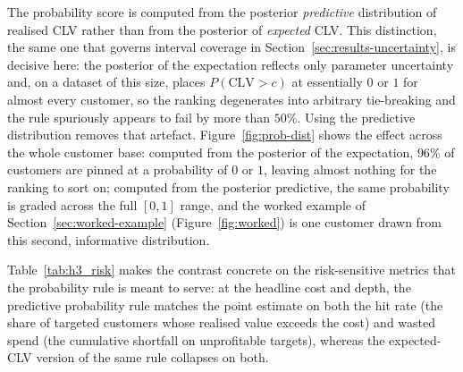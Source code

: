 

The probability score is computed from the posterior \emph{predictive} distribution of realised CLV rather than from the posterior of \emph{expected} CLV. This distinction, the same one that governs interval coverage in Section~\ref{sec:results-uncertainty}, is decisive here: the posterior of the expectation reflects only parameter uncertainty and, on a dataset of this size, places $P(\text{CLV} > c)$ at essentially $0$ or $1$ for almost every customer, so the ranking degenerates into arbitrary tie-breaking and the rule spuriously appears to fail by more than $50\%$. Using the predictive distribution removes that artefact. Figure~\ref{fig:prob-dist} shows the effect across the whole customer base: computed from the posterior of the expectation, $96\%$ of customers are pinned at a probability of $0$ or $1$, leaving almost nothing for the ranking to sort on; computed from the posterior predictive, the same probability is graded across the full $[0,1]$ range, and the worked example of Section~\ref{sec:worked-example} (Figure~\ref{fig:worked}) is one customer drawn from this second, informative distribution.

 Table~\ref{tab:h3_risk} makes the contrast concrete on the risk-sensitive metrics that the probability rule is meant to serve: at the headline cost and depth, the predictive probability rule matches the point estimate on both the hit rate (the share of targeted customers whose realised value exceeds the cost) and wasted spend (the cumulative shortfall on unprofitable targets), whereas the expected-CLV version of the same rule collapses on both.


